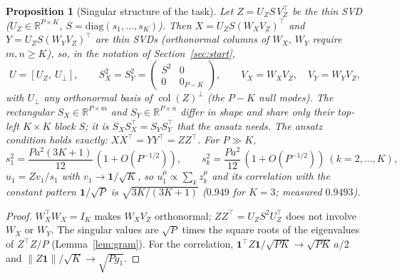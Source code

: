 \documentclass[11pt,a4paper]{article}
\newcommand{\R}{\mathbb R}
\newcommand{\col}{\operatorname{col}}
\newtheorem{proposition}{Proposition}
\theoremstyle{remark}
\begin{document}
\begin{proposition}[Singular structure of the task]\label{prop:svd}
Let $Z = U_ZS\,V_Z^\top$ be the thin SVD ($U_Z\in\R^{P\times K}$, $S = \mathrm{diag}(s_1,\dots,s_K)$). Then $X = U_ZS(W_XV_Z)^\top$ and $Y = U_ZS(W_YV_Z)^\top$ are thin SVDs (orthonormal columns of $W_X$, $W_Y$ require $m, n\ge K$), so, in the notation of Section~\ref{sec:start},
\begin{equation}
  U = [U_Z,\ U_\perp],\qquad S_X^2 = S_Y^2 = \begin{pmatrix}S^2 & 0\\ 0 & 0_{P-K}\end{pmatrix},\qquad V_X = W_XV_Z,\quad V_Y = W_YV_Z,
\end{equation}
with $U_\perp$ any orthonormal basis of $\col(Z)^\perp$ (the $P-K$ null modes). The rectangular $S_X\in\R^{P\times m}$ and $S_Y\in\R^{P\times n}$ differ in shape and share only their top-left $K\times K$ block $S$; it is $S_XS_X^\top = S_YS_Y^\top$ that the ansatz needs. The ansatz condition holds \emph{exactly}: $XX^\top = YY^\top = ZZ^\top$. For $P\gg K$,
\begin{equation}
  s_1^2 = \frac{Pa^2(3K+1)}{12}\,(1 + O(P^{-1/2})),\qquad s_k^2 = \frac{Pa^2}{12}\,(1 + O(P^{-1/2}))\ (k = 2,\dots,K),
\end{equation}
$u_1 = Zv_1/s_1$ with $v_1\to\mathbf 1/\sqrt K$, so $u_1^\mu\propto\sum_kz^\mu_k$ and its correlation with the constant pattern $\mathbf 1/\sqrt P$ is $\sqrt{3K/(3K+1)}$ ($0.949$ for $K = 3$; measured $0.9493$).
\end{proposition}
\begin{proof}
$W_X^\top W_X = I_K$ makes $W_XV_Z$ orthonormal; $ZZ^\top = U_ZS^2U_Z^\top$ does not involve $W_X$ or $W_Y$. The singular values are $\sqrt P$ times the square roots of the eigenvalues of $Z^\top Z/P$ (Lemma~\ref{lem:gram}). For the correlation, $\mathbf 1^\top Z\mathbf 1/\sqrt{PK} \to \sqrt{PK}\,a/2$ and $\|Z\mathbf 1\|/\sqrt K\to\sqrt{P g_1}$.
\end{proof}
\end{document}
